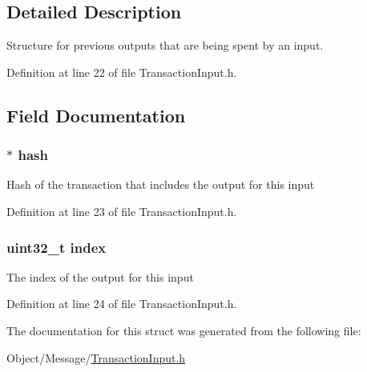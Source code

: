 \subsection{Detailed Description}
Structure for previous outputs that are being spent by an input. 

Definition at line 22 of file TransactionInput.h.



\subsection{Field Documentation}
\hypertarget{struct_m_i_previous_output_a0a38e6cfdba79d307f90c5cd5e7425df}{
\subsubsection[{hash}]{$\ast$ {\bf hash}}}
\label{struct_m_i_previous_output_a0a38e6cfdba79d307f90c5cd5e7425df}
Hash of the transaction that includes the output for this input 

Definition at line 23 of file TransactionInput.h.

\hypertarget{struct_m_i_previous_output_aafd95f8c7a99b9189ede7cdf0871ebe8}{
\subsubsection[{index}]{\setlength{\rightskip}{0pt plus 5cm}uint32\_\-t {\bf index}}}
\label{struct_m_i_previous_output_aafd95f8c7a99b9189ede7cdf0871ebe8}
The index of the output for this input 

Definition at line 24 of file TransactionInput.h.



The documentation for this struct was generated from the following file:\begin{DoxyCompactItemize}
\item 
Object/Message/\hyperlink{_m_i_transaction_input_8h}{TransactionInput.h}\end{DoxyCompactItemize}
